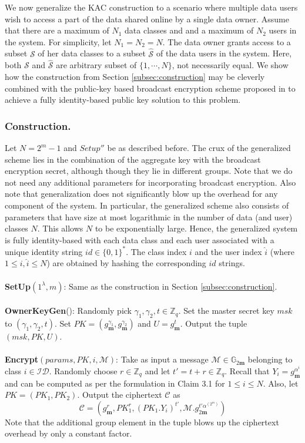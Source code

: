 We now generalize the KAC construction to a scenario where multiple data users wish to access a part of the data shared online by a single data owner. Assume that there are a maximum of $N_1$ data classes and and a maximum of $N_2$ users in the system. For simplicity, let $N_1=N_2=N$. The data owner grants access to a subset $\mathcal{S}$ of her data classes to a subset $\hat{\mathcal{S}}$ of the data users in the system. Here, both $\mathcal{S}$ and $\hat{\mathcal{S}}$ are arbitrary subset of $\{1,\cdots,N\}$, not necessarily equal. We show how the construction from Section \ref{subsec:construction} may be cleverly combined with the public-key based broadcast encryption scheme proposed in \cite{boneh2014low} to achieve a fully identity-based public key solution to this problem. 
% 
\subsubsection{Construction.} Let $N=2^m-1$ and $Setup''$ be as described before. The crux of the generalized scheme lies in the combination of the aggregate key with the broadcast encryption secret, although though they lie in different groups. Note that we do not need any additional parameters for incorporating broadcast encryption. Also note that generalization does not significantly blow up the overhead for any component of the system. In particular, the generalized scheme also consists of parameters that have size at most logarithmic in the number of data (and user) classes $N$. This allows $N$ to be exponentially large. Hence, the generalized system is fully identity-based with each data class and each user associated with a unique identity string $id\in\{0,1\}^{*}$. The class index $i$ and the user index $\hat{i}$ (where $1\leq i,\hat{i} \leq N$) are obtained by hashing the corresponding $id$ strings.\\\\
% 
\noindent\textbf{SetUp}$(1^{\lambda},m)$: Same as the construction in Section \ref{subsec:construction}.\\\\
% 
\noindent\textbf{OwnerKeyGen}(): Randomly pick $\gamma_1, \gamma_2, t \in \mathbb{Z}_q$. Set the master secret key $msk$ to $(\gamma_1,\gamma_2,t)$. Set $PK=(g^{\gamma_1}_{\mathbf{m}},g^{\gamma_2}_{\mathbf{m}})$ and $U=g^{t}_{\mathbf{m}}$. Output the tuple $(msk,PK,U)$.\\\\
% 
\noindent\textbf{Encrypt}$(params,PK,i,\mathcal{M})$: Take as input a message $\mathcal{M} \in \mathbb{G}_{2\mathbf{m}}$ belonging to class $i \in \mathcal{ID}$. Randomly choose $r\in\mathbb{Z}_q$ and let $t'=t+r \in\mathbb{Z}_q$. Recall that $Y_i=g^{\alpha^i}_{\mathbf{m}}$ and can be computed as per the formulation in Claim 3.1 for $1\leq i\leq N$. Also, let $PK=(PK_1,PK_2)$. Output the ciphertext $\mathcal{C}$ as 
\begin{equation}
 \mathcal{C}=\left(g^r_{\mathbf{m}},PK^r_1,(PK_1.Y_i)^{t'},\mathcal{M}.g^{t'\alpha^{(2^m)}}_{2\mathbf{m}}\right)\nonumber
\end{equation}
\noindent Note that the additional group element in the tuple blows up the ciphertext overhead by only a constant factor.\\

